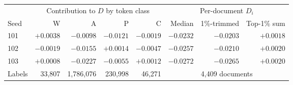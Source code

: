 \begin{tabular}{@{}lrrrrrrr@{}}
\toprule
 & \multicolumn{4}{c}{Contribution to $D$ by token class} & \multicolumn{3}{c}{Per-document $D_i$} \\
\cmidrule(lr){2-5}\cmidrule(lr){6-8}
Seed & W & A & P & C & Median & 1\%-trimmed & Top-1\% sum \\
\midrule
101 & ${+}0.0038$ & $-0.0098$ & $-0.0121$ & $-0.0019$ & $-0.0232$ & $-0.0203$ & ${+}0.0018$ \\
102 & $-0.0019$ & $-0.0155$ & ${+}0.0014$ & $-0.0047$ & $-0.0257$ & $-0.0210$ & ${+}0.0020$ \\
103 & ${+}0.0008$ & $-0.0227$ & $-0.0055$ & ${+}0.0012$ & $-0.0272$ & $-0.0265$ & ${+}0.0020$ \\
Labels & 33,807 & 1,786,076 & 230,998 & 46,271 & \multicolumn{3}{c}{4,409 documents} \\
\bottomrule
\end{tabular}
